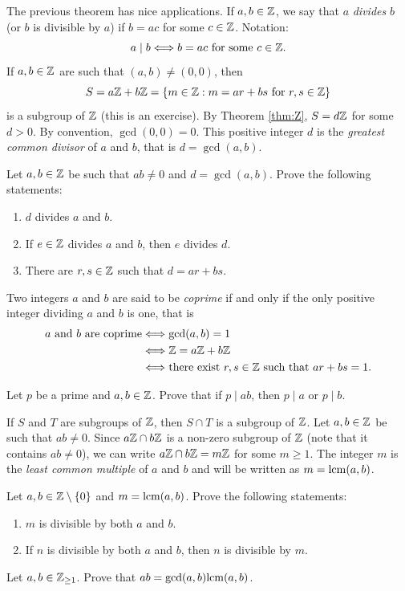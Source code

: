 The previous theorem has nice applications. 
If $a,b\in\mathbb{Z}$, we say that $a$ \emph{divides} $b$ (or $b$ is divisible by $a$)
if $b=ac$ for some $c\in\mathbb{Z}$. Notation: 
\[
a\mid b\Longleftrightarrow b=ac\text{ for some $c\in\mathbb{Z}$.}
\]
If $a,b\in\mathbb{Z}$ are such that $(a,b)\ne(0,0)$, then 
\[
S=a\mathbb{Z}+b\mathbb{Z}=\{m\in\mathbb{Z}:m=ar+bs\text{ for $r,s\in\mathbb{Z}$}\}
\]
is a subgroup of $\mathbb{Z}$ (this is an exercise). 
By Theorem \ref{thm:Z}, $S=d\mathbb{Z}$ for some $d>0$. By convention, $\gcd(0,0)=0$. 
This positive integer $d$
is the \emph{greatest common divisor} of $a$ and $b$, 
that is $d=\gcd(a,b)$. 

\begin{exercise}
Let $a,b\in\mathbb{Z}$ be such that $ab\ne0$ and $d=\gcd(a,b)$. 
Prove the following statements:
\begin{enumerate}
\item $d$ divides $a$ and $b$.
\item If $e\in\mathbb{Z}$ divides $a$ and $b$, then $e$ divides $d$.
\item There are $r,s\in\mathbb{Z}$ such that $d=ar+bs$.
\end{enumerate}
\end{exercise}

Two integers $a$ and $b$ are said to be \emph{coprime} if 
and only if the only positive integer dividing 
$a$ and $b$ is one, that is  
\begin{align*}
a\text{ and }b\text{ are coprime}&\Longleftrightarrow \gcd(a,b)=1\\
&\Longleftrightarrow \mathbb{Z}=a\mathbb{Z}+b\mathbb{Z}\\
&\Longleftrightarrow \text{there exist $r,s\in\mathbb{Z}$ such that $ar+bs=1$.}
\end{align*}

\begin{exercise}
        Let $p$ be a prime and 
        $a,b\in\mathbb{Z}$. Prove that if $p\mid ab$, 
        then $p\mid a$ or $p\mid b$.
\end{exercise}

If $S$ and $T$ are subgroups of $\mathbb{Z}$, then $S\cap T$
is a subgroup of $\mathbb{Z}$.
Let $a,b\in\mathbb{Z}$ be such that $ab\ne 0$. Since $a\mathbb{Z}\cap b\mathbb{Z}$ 
is a non-zero subgroup of $\mathbb{Z}$ (note that it contains $ab\ne 0$), 
we can write  $a\mathbb{Z}\cap b\mathbb{Z}=m\mathbb{Z}$
for some $m\geq1$. The integer $m$
is the \emph{least common multiple} of $a$ and $b$ 
and will be written as $m=\mathrm{lcm}(a,b)$.

\begin{exercise}
Let $a,b\in\mathbb{Z}\setminus\{0\}$ and $m=\mathrm{lcm}(a,b)$. 
Prove the following statements:
\begin{enumerate}
        \item $m$ is divisible by both $a$ and $b$.
        \item If $n$ is divisible by both $a$ and $b$, then 
        $n$ is divisible by $m$.
\end{enumerate}
\end{exercise}

\begin{exercise}
Let $a,b\in\mathbb{Z}_{\geq1}$. Prove that 
$ab=\gcd(a,b)\mathrm{lcm}(a,b)$.
\end{exercise}



